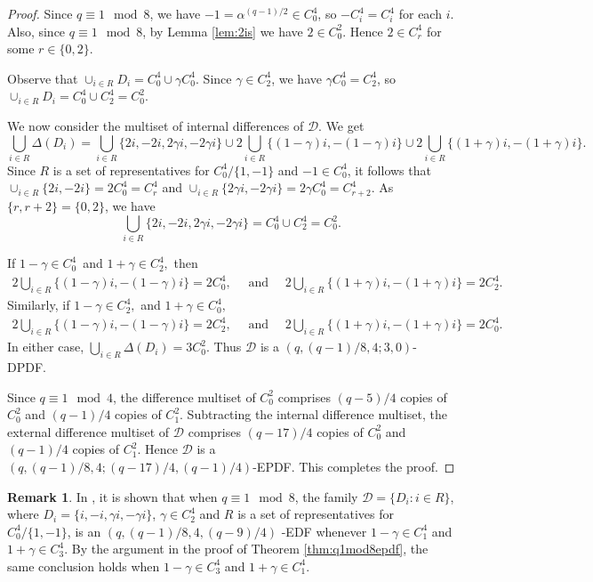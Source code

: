 \documentclass[12pt, a4paper]{article}
\theoremstyle{definition}
\newtheorem{remark}[theorem]{Remark}
\begin{document}
\begin{proof}
	Since $q \equiv 1 \mod 8$, we have $-1=\alpha^{(q-1)/2}\in C_0^4$, so $-C_i^4=C_i^4$ for each $i$. Also, since $q \equiv 1 \mod 8$, by Lemma \ref{lem:2is} we have $2 \in C_0^2$. Hence $2 \in C_r^4$ for some $r \in \{0,2\}$.
	
	Observe that 
	$
	\cup_{i\in R}D_i=C_0^4\cup \gamma C_0^4.
	$ 
	Since $\gamma \in C_2^4$, we have $\gamma C_0^4=C_2^4$, so
	$
	\cup_{i\in R}D_i=C_0^4\cup C_2^4=C_0^2.
	$ 
	
	We now consider the multiset of internal differences of $\mathcal{D}$. We get
	\[
	\bigcup_{i\in R}\Delta(D_i)
	=
	\bigcup_{i\in R}\{2i,-2i,2\gamma i,-2\gamma i\}
	\cup
	2\bigcup_{i\in R}\{(1-\gamma)i,-(1-\gamma)i\}
	\cup
	2\bigcup_{i\in R}\{(1+\gamma)i,-(1+\gamma)i\}.
	\]
	Since $R$ is a set of representatives for $C_0^4/\{1,-1\}$ and $-1\in C_0^4$, it follows that
	$
	\cup_{i\in R}\{2i,-2i\}=2C_0^4=C_r^4
	$ 
	and
	$
	\cup_{i\in R}\{2\gamma i,-2\gamma i\}=2\gamma C_0^4=C_{r+2}^4.
	$ 
	As $\{r,r+2\}=\{0,2\}$, we have
	\[
	\bigcup_{i\in R}\{2i,-2i,2\gamma i,-2\gamma i\}=C_0^4 \cup C_2^4=C_0^2.
	\]
	
	If
	$
	1-\gamma \in C_0^4$ and $  1+\gamma \in C_2^4,
	$ 
	then
	\begin{align*}
		2\bigcup_{i\in R}\{(1-\gamma)i,-(1-\gamma)i\} = 2C_0^4,  \quad \text{ and }
		\quad 2\bigcup_{i\in R}\{(1+\gamma)i,-(1+\gamma)i\} = 2C_2^4.
	\end{align*}
	Similarly, if
	$
	1-\gamma \in C_2^4,$ and $ 1+\gamma \in C_0^4,
	$ 
	\begin{align*}
		2\bigcup_{i\in R}\{(1-\gamma)i,-(1-\gamma)i\} = 2C_2^4,  \quad \text{ and }
		\quad 2\bigcup_{i\in R}\{(1+\gamma)i,-(1+\gamma)i\} = 2C_0^4.
	\end{align*}
	In either case,
	$
	\bigcup_{i \in R} \Delta(D_i)=3C_0^2.
	$ 	Thus $\mathcal{D}$ is a $(q,(q-1)/8,4;3,0)$-DPDF.
	
	
	
	Since $q \equiv 1 \mod 4$, the difference multiset of $C_0^2$ comprises $(q-5)/4$ copies of $C_0^2$ and $(q-1)/4$ copies of $C_1^2$. Subtracting the internal difference multiset, the external difference multiset of $\mathcal{D}$ comprises $(q-17)/4$ copies of $C_0^2$ and $(q-1)/4$ copies of $C_1^2$. Hence $\mathcal{D}$ is a $(q,(q-1)/8,4;(q-17)/4,(q-1)/4)$-EPDF. This completes the proof.
\end{proof}

\begin{remark}
In \cite{ChaDin}, it is shown that when $q \equiv 1 \mod 8$, the family $\mathcal{D}= \{D_i : i \in R\}$, where $D_i=\{i,-i,\gamma i,-\gamma i\}$, $\gamma \in C_2^4$ and $R$ is a set of representatives for $C_0^4/\{1,-1\}$, is an $(q,(q-1)/8,4,(q-9)/4)$ -EDF whenever $1-\gamma \in C_1^4$  and $  1+\gamma \in C_3^4$.  By the argument in the proof of Theorem \ref{thm:q1mod8epdf}, the same conclusion holds when
$1-\gamma \in C_3^4$  and $ 1+\gamma \in C_1^4$. 
\end{remark}
\end{document}
